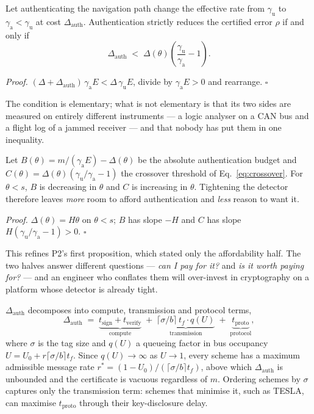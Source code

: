 \documentclass[11pt,a4paper]{article}
\newcommand{\Dauth}{\Delta_{\mathrm{auth}}}
\newcommand{\gu}{\gamma_{\mathrm{u}}}
\newcommand{\ga}{\gamma_{\mathrm{a}}}
\begin{document}
\begin{proposition}[Crossover]
\label{pr:crossover}
Let authenticating the navigation path change the effective rate from $\gu$ to
$\ga<\gu$ at cost $\Dauth$. Authentication strictly reduces the certified
error $\rho$ if and only if
\begin{equation}
\label{eq:crossover}
\Dauth \;<\; \Delta(\theta)\left(\frac{\gu}{\ga}-1\right).
\end{equation}
\end{proposition}
\noindent\emph{Proof.} $(\Delta+\Dauth)\,\ga E < \Delta\,\gu E$, divide by
$\ga E>0$ and rearrange. \hfill$\square$

\smallskip
\noindent
The condition is elementary; what is not elementary is that its two sides are
measured on entirely different instruments --- a logic analyser on a CAN bus and
a flight log of a jammed receiver --- and that nobody has put them in one
inequality.

\begin{proposition}
\label{pr:afford}
Let $B(\theta)=m/(\ga E)-\Delta(\theta)$ be the absolute authentication budget
and $C(\theta)=\Delta(\theta)(\gu/\ga-1)$ the crossover threshold of
Eq.~\eqref{eq:crossover}. For $\theta<s$, $B$ is decreasing in $\theta$ and $C$
is increasing in $\theta$. Tightening the detector therefore leaves
\emph{more} room to afford authentication and \emph{less} reason to want it.
\end{proposition}
\noindent\emph{Proof.} $\Delta(\theta)=H\theta$ on $\theta<s$; $B$ has slope
$-H$ and $C$ has slope $H(\gu/\ga-1)>0$. \hfill$\square$

\smallskip
\noindent
This refines P2's first proposition, which stated only the affordability half.
The two halves answer different questions --- \emph{can I pay for it?} and
\emph{is it worth paying for?} --- and an engineer who conflates them will
over-invest in cryptography on a platform whose detector is already tight.

\begin{proposition}
\label{pr:cliff}
$\Dauth$ decomposes into compute, transmission and protocol terms,
\[
\Dauth \;=\; \underbrace{t_{\mathrm{sign}}+t_{\mathrm{verify}}}_{\text{compute}}
\;+\; \underbrace{\lceil\sigma/b\rceil\,t_f\cdot q(U)}_{\text{transmission}}
\;+\; \underbrace{t_{\mathrm{proto}}}_{\text{protocol}} ,
\]
where $\sigma$ is the tag size and $q(U)$ a queueing factor in bus occupancy
$U=U_0+r\lceil\sigma/b\rceil t_f$. Since $q(U)\to\infty$ as $U\to1$, every scheme
has a maximum admissible message rate
$r^{*}=(1-U_0)/(\lceil\sigma/b\rceil t_f)$, above which $\Dauth$ is unbounded and
the certificate is vacuous regardless of $m$. Ordering schemes by $\sigma$
captures only the transmission term: schemes that minimise it, such as TESLA,
can maximise $t_{\mathrm{proto}}$ through their key-disclosure delay.
\end{proposition}
\end{document}
